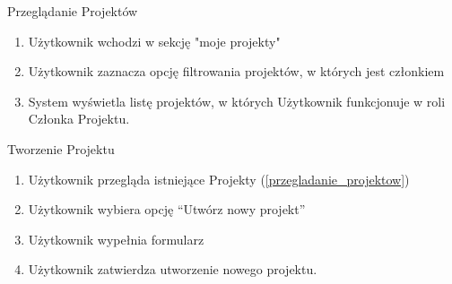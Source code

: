 \begin{usecase}{Przeglądanie Projektów}
\label{przegladanie_projektow}
	\begin{enumerate}
      \item Użytkownik wchodzi w sekcję "moje projekty"
      \item Użytkownik zaznacza opcję filtrowania projektów, w których jest członkiem
      \item System wyświetla listę projektów, w których Użytkownik funkcjonuje w roli Członka Projektu.
	\end{enumerate}
	\parindent=0cm
\end{usecase}


\begin{usecase}{Tworzenie Projektu}
\label{tworzenie_projektu}
	\begin{enumerate}
    \item Użytkownik przegląda istniejące Projekty (\ref{przegladanie_projektow})
    \item Użytkownik wybiera opcję  “Utwórz nowy projekt”
    \item Użytkownik wypełnia formularz
    \item Użytkownik zatwierdza utworzenie nowego projektu.
	\end{enumerate}
\end{usecase}


